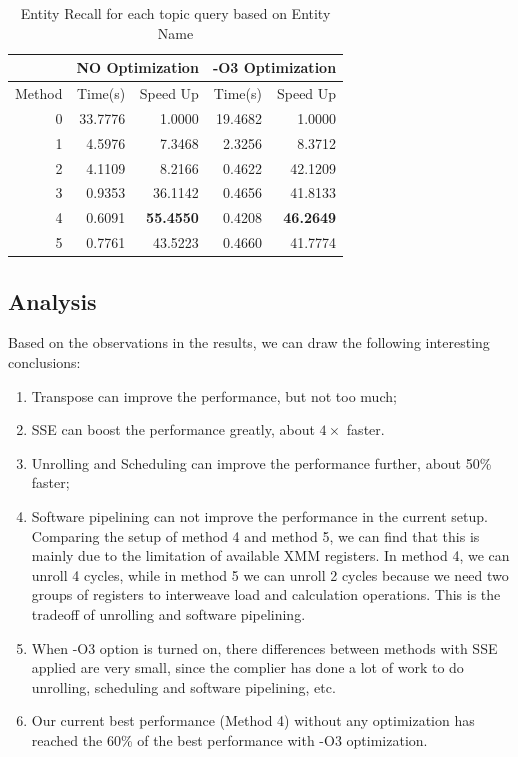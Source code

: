 \documentclass[12pt]{article}
\begin{document}
\begin{table}[h!]
	\small
	\begin{center}
	\caption{\label{tab:performance} Entity Recall for each topic query 
	based on Entity Name}
	\begin{tabular}{|r|r|r|r|r|}
		\hline
		 & \multicolumn{2}{c|}{NO Optimization} & \multicolumn{2}{c|}{-O3 Optimization} \\ \hline
		Method & Time(s) & Speed Up & Time(s) & Speed Up \\ \hline
		0  &  33.7776	& 1.0000		&19.4682		&	1.0000 \\ \hline
		1  &		4.5976		&	7.3468		& 2.3256		&	8.3712 \\ \hline
		2  &		4.1109  & 8.2166		&	0.4622		&	42.1209 \\ \hline
		3  &		0.9353  & 36.1142	&	0.4656		&	41.8133 \\ \hline
		4  &		0.6091  & \textbf{55.4550}	& 0.4208		&	\textbf {46.2649} \\ \hline
		5  &		0.7761  & 43.5223	&	0.4660		&	41.7774 \\ \hline
	\end{tabular}
	\end{center}
\end{table}

\subsection{Analysis}
Based on the observations in the results, we can draw the following interesting 
conclusions:
\begin{enumerate}
\item Transpose can improve the performance, but not too much;
\item SSE can boost the performance greatly, about $4\times$ faster.
\item Unrolling and Scheduling can improve the performance further, about 50\% faster;
\item Software pipelining can not improve the performance in the current setup. 
Comparing the setup of method 4 and method 5, we can find that this is mainly due to
the limitation of available XMM registers. In method 4, we can unroll 4 cycles, while
in method 5 we can unroll 2 cycles because we need two groups of registers to 
interweave load and calculation operations. This is the tradeoff of unrolling and
software pipelining.
\item When -O3 option is turned on, there differences between methods with SSE 
applied are very small, since the complier has done a lot of work to do unrolling,
scheduling and software pipelining, etc.
\item Our current best performance (Method 4) without any optimization has reached 
the 60\% of the best performance with -O3 optimization.
\end{enumerate}
\end{document}
